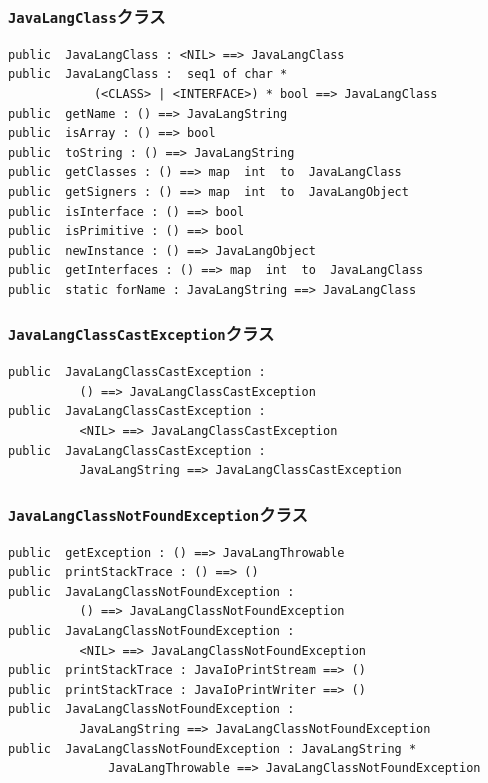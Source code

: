 \documentclass[\pformat,12pt]{jarticle}
\begin{document}
\subsubsection{\texttt{JavaLangClass}クラス}
\begin{small}
\begin{verbatim}
public  JavaLangClass : <NIL> ==> JavaLangClass
public  JavaLangClass :  seq1 of char * 
            (<CLASS> | <INTERFACE>) * bool ==> JavaLangClass
public  getName : () ==> JavaLangString
public  isArray : () ==> bool
public  toString : () ==> JavaLangString
public  getClasses : () ==> map  int  to  JavaLangClass
public  getSigners : () ==> map  int  to  JavaLangObject
public  isInterface : () ==> bool
public  isPrimitive : () ==> bool
public  newInstance : () ==> JavaLangObject
public  getInterfaces : () ==> map  int  to  JavaLangClass
public  static forName : JavaLangString ==> JavaLangClass
\end{verbatim}
\end{small}

\subsubsection{\texttt{JavaLangClassCastException}クラス}
\begin{small}
\begin{verbatim}
public  JavaLangClassCastException : 
          () ==> JavaLangClassCastException
public  JavaLangClassCastException : 
          <NIL> ==> JavaLangClassCastException
public  JavaLangClassCastException : 
          JavaLangString ==> JavaLangClassCastException
\end{verbatim}
\end{small}

\subsubsection{\texttt{JavaLangClassNotFoundException}クラス}
\begin{small}
\begin{verbatim}
public  getException : () ==> JavaLangThrowable
public  printStackTrace : () ==> ()
public  JavaLangClassNotFoundException : 
          () ==> JavaLangClassNotFoundException
public  JavaLangClassNotFoundException : 
          <NIL> ==> JavaLangClassNotFoundException
public  printStackTrace : JavaIoPrintStream ==> ()
public  printStackTrace : JavaIoPrintWriter ==> ()
public  JavaLangClassNotFoundException : 
          JavaLangString ==> JavaLangClassNotFoundException
public  JavaLangClassNotFoundException : JavaLangString * 
              JavaLangThrowable ==> JavaLangClassNotFoundException
\end{verbatim}
\end{small}
\end{document}
